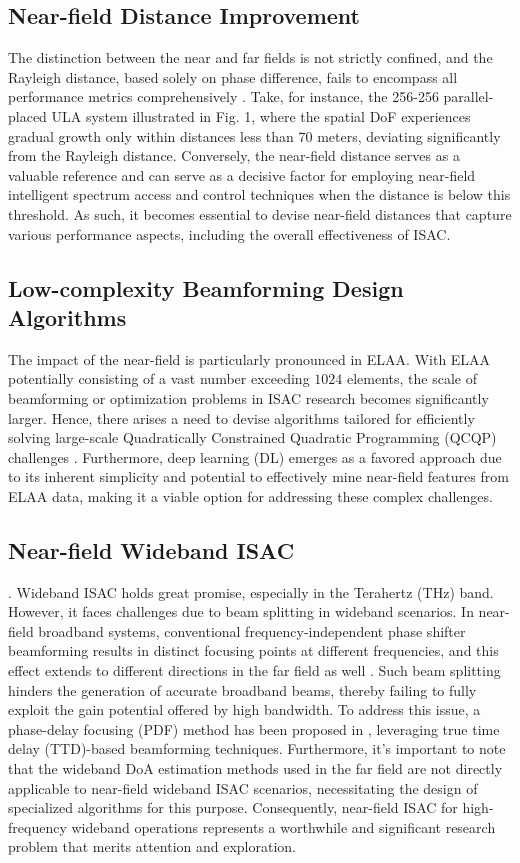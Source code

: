\documentclass[10pt,journal,twocolumn,twoside]{IEEEtran} %
\begin{document}
\subsection{Near-field Distance Improvement}
The distinction between the near and far fields is not strictly confined, and the Rayleigh distance, based solely on phase difference, fails to encompass all performance metrics comprehensively \cite{9508850}. Take, for instance, the 256-256 parallel-placed ULA system illustrated in Fig. 1, where the spatial DoF experiences gradual growth only within distances less than 70 meters, deviating significantly from the Rayleigh distance. Conversely, the near-field distance serves as a valuable reference and can serve as a decisive factor for employing near-field intelligent spectrum access and control techniques when the distance is below this threshold. As such, it becomes essential to devise near-field distances that capture various performance aspects, including the overall effectiveness of ISAC.
\subsection{Low-complexity Beamforming Design Algorithms}

The impact of the near-field is particularly pronounced in ELAA. With ELAA potentially consisting of a vast number exceeding $1024$ elements, the scale of beamforming or optimization problems in ISAC research becomes significantly larger. Hence, there arises a need to devise algorithms tailored for efficiently solving large-scale Quadratically Constrained Quadratic Programming (QCQP) challenges \cite{CongFinite2022}. Furthermore, deep learning (DL) emerges as a favored approach due to its inherent simplicity and potential to effectively mine near-field features from ELAA data, making it a viable option for addressing these complex challenges.

\subsection{Near-field Wideband ISAC}. 
Wideband ISAC holds great promise, especially in the Terahertz (THz) band. However, it faces challenges due to beam splitting in wideband scenarios. In near-field broadband systems, conventional frequency-independent phase shifter beamforming results in distinct focusing points at different frequencies, and this effect extends to different directions in the far field as well \cite{cui2021nearfield}. Such beam splitting hinders the generation of accurate broadband beams, thereby failing to fully exploit the gain potential offered by high bandwidth. To address this issue, a phase-delay focusing (PDF) method has been proposed in \cite{cui2021nearfield}, leveraging true time delay (TTD)-based beamforming techniques. Furthermore, it's important to note that the wideband DoA estimation methods used in the far field are not directly applicable to near-field wideband ISAC scenarios, necessitating the design of specialized algorithms for this purpose. Consequently, near-field ISAC for high-frequency wideband operations represents a worthwhile and significant research problem that merits attention and exploration.
\end{document}
